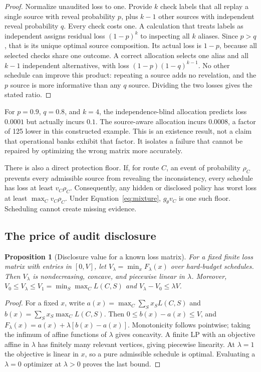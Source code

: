 \documentclass[11pt,letterpaper]{article}
\newtheorem{proposition}{Proposition}
\begin{document}
\begin{proof}
Normalize unaudited loss to one. Provide $k$ check labels that all replay a single source with reveal probability $p$, plus $k-1$ other sources with independent reveal probability $q$. Every check costs one. A calculation that treats labels as independent assigns residual loss $(1-p)^k$ to inspecting all $k$ aliases. Since $p>q$, that is its unique optimal source composition. Its actual loss is $1-p$, because all selected checks share one outcome. A correct allocation selects one alias and all $k-1$ independent alternatives, with loss $(1-p)(1-q)^{k-1}$. No other schedule can improve this product: repeating a source adds no revelation, and the $p$ source is more informative than any $q$ source. Dividing the two losses gives the stated ratio.
\end{proof}

For $p=0.9$, $q=0.8$, and $k=4$, the independence-blind allocation predicts loss $0.0001$ but actually incurs $0.1$. The source-aware allocation incurs $0.0008$, a factor of 125 lower in this constructed example. This is an existence result, not a claim that operational banks exhibit that factor. It isolates a failure that cannot be repaired by optimizing the wrong matrix more accurately.

There is also a direct protection floor. If, for route $C$, an event of probability $\rho_C$ prevents every admissible source from revealing the inconsistency, every schedule has loss at least $v_C\rho_C$. Consequently, any hidden or disclosed policy has worst loss at least $\max_C v_C\rho_C$. Under Equation~\ref{eq:mixture}, $g_\theta v_C$ is one such floor. Scheduling cannot create missing evidence.

\subsection{The price of audit disclosure}

\begin{proposition}[Disclosure value for a known loss matrix]
\label{prop:leakage}
For a fixed finite loss matrix with entries in $[0,V]$, let
$V_\lambda=\min_x F_\lambda(x)$ over hard-budget schedules. Then $V_\lambda$ is nondecreasing, concave, and piecewise linear in $\lambda$. Moreover,
$V_0\leq V_\lambda\leq V_1=\min_S\max_C L(C,S)$ and
$V_\lambda-V_0\leq\lambda V$.
\end{proposition}

\begin{proof}
For a fixed $x$, write $a(x)=\max_C\sum_Sx_SL(C,S)$ and
$b(x)=\sum_Sx_S\max_C L(C,S)$. Then $0\leq b(x)-a(x)\leq V$, and $F_\lambda(x)=a(x)+\lambda[b(x)-a(x)]$. Monotonicity follows pointwise; taking the infimum of affine functions of $\lambda$ gives concavity. A finite LP with an objective affine in $\lambda$ has finitely many relevant vertices, giving piecewise linearity. At $\lambda=1$ the objective is linear in $x$, so a pure admissible schedule is optimal. Evaluating a $\lambda=0$ optimizer at $\lambda>0$ proves the last bound.
\end{proof}
\end{document}
